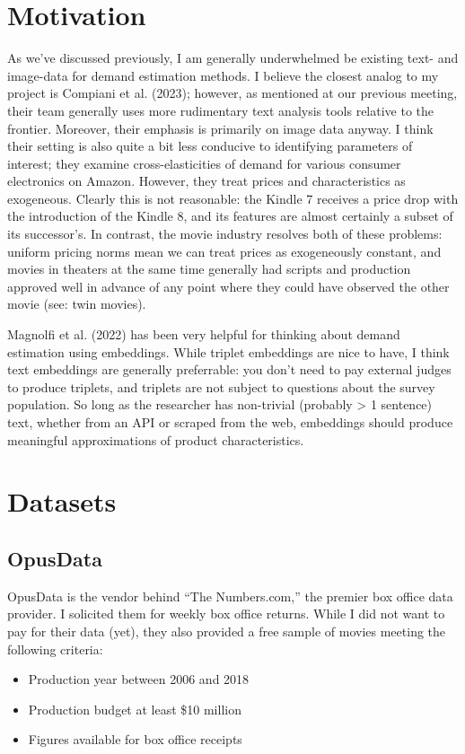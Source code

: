 \documentclass{article}
\begin{document}
\section{Motivation}

As we've discussed previously, I am generally underwhelmed be existing text- and image-data for demand estimation methods. I believe the closest analog to my project is Compiani et al. (2023); however, as mentioned at our previous meeting, their team generally uses more rudimentary text analysis tools relative to the frontier. Moreover, their emphasis is primarily on image data anyway. I think their setting is also quite a bit less conducive to identifying parameters of interest; they examine cross-elasticities of demand for various consumer electronics on Amazon. However, they treat prices and characteristics as exogeneous. Clearly this is not reasonable: the Kindle 7 receives a price drop with the introduction of the Kindle 8, and its features are almost certainly a subset of its successor's. In contrast, the movie industry resolves both of these problems: uniform pricing norms mean we can treat prices as exogeneously constant, and movies in theaters at the same time generally had scripts and production approved well in advance of any point where they could have observed the other movie (see: twin movies). 

Magnolfi et al. (2022) has been very helpful for thinking about demand estimation using embeddings. While triplet embeddings are nice to have, I think text embeddings are generally preferrable: you don't need to pay external judges to produce triplets, and triplets are not subject to questions about the survey population. So long as the researcher has non-trivial (probably > 1 sentence) text, whether from an API or scraped from the web, embeddings should produce meaningful approximations of product characteristics. 

\section{Datasets}

\subsection{OpusData}

OpusData is the vendor behind ``The Numbers.com,'' the premier box office data provider. I solicited them for weekly box office returns. While I did not want to pay for their data (yet), they also provided a free sample of movies meeting the following criteria:
\begin{itemize}
    \item Production year between 2006 and 2018
    \item Production budget at least \$10 million
    \item Figures available for box office receipts
\end{itemize}
\end{document}
